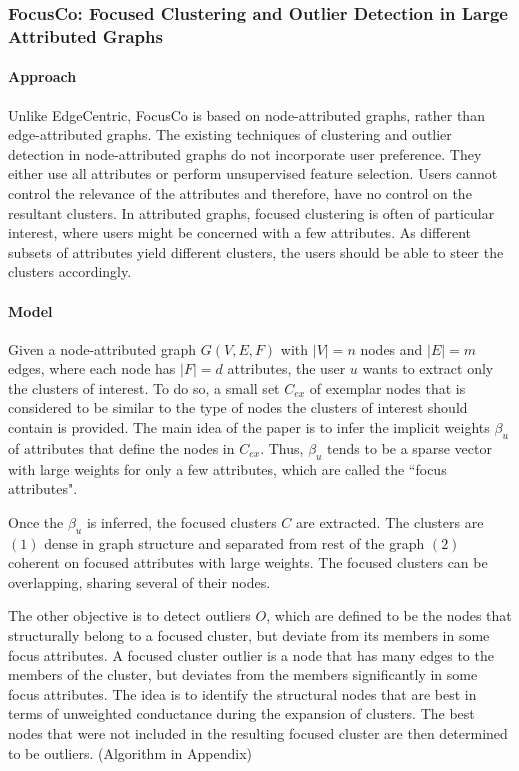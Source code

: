 \documentclass[11pt, oneside]{article}   	%
\begin{document}
\subsubsection{FocusCo: Focused Clustering and Outlier Detection in Large Attributed Graphs }

\paragraph{Approach}
\quad

\quad Unlike EdgeCentric, FocusCo \cite{focusco} is based on node-attributed graphs, rather than edge-attributed graphs.
The existing techniques of clustering and outlier detection in node-attributed graphs do not incorporate user preference.
They either use all attributes or perform unsupervised feature selection.
Users cannot control the relevance of the attributes and therefore, have no control on the resultant clusters.
In attributed graphs, focused clustering is often of particular interest, where users might be concerned with a few attributes. 
As different subsets of attributes yield different clusters, the users should be able to steer the clusters accordingly.

\paragraph{Model}
\quad

\quad Given a node-attributed graph $G(V,E,F)$ with $|V|=n$ nodes and $|E|=m$ edges, where each node has $|F| = d$ attributes, the user $u$ wants to extract only the clusters of interest.
To do so, a small set $C_{ex}$ of exemplar nodes that is considered to be similar to the type of nodes the clusters of interest should contain is provided.
The main idea of the paper is to infer the implicit weights $\beta_{u}$ of attributes that define the nodes in $C_{ex}$.
Thus, $\beta_u$ tends to be a sparse vector with large weights for only a few attributes, which are called the ``focus attributes".

\quad Once the $\beta_u$ is inferred, the focused clusters $C$ are extracted. 
The clusters are $(1)$ dense in graph structure and separated from rest of the graph $(2)$ coherent on focused attributes with large weights.
The focused clusters can be overlapping, sharing several of their nodes.

\quad The other objective is to detect outliers $O$, which are defined to be the nodes that structurally belong to a focused cluster, but deviate from its members in some focus attributes. A focused cluster outlier is a node that has many edges to the members of the cluster, but deviates from the members significantly in some focus attributes.
The idea is to identify the structural nodes that are best in terms of unweighted conductance during the expansion of clusters.
The best nodes that were not included in the resulting focused cluster are then determined to be outliers. (Algorithm in Appendix)
\end{document}

